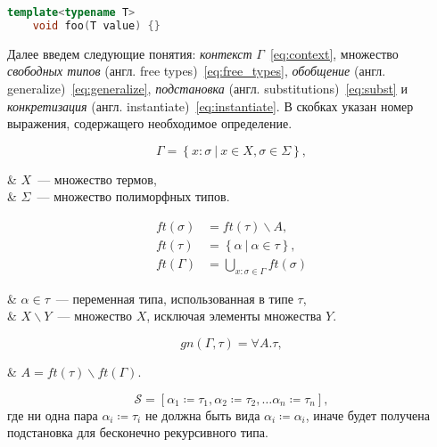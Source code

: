 \begin{lstlisting}[language=C++,label=lst:generics,caption={Определение обобщенной функции в C++}]
    template<typename T>
    void foo(T value) {}
\end{lstlisting}

Далее введем следующие понятия:
\textit{контекст} $\Gamma$~\eqref{eq:context},
множество \textit{свободных типов} (англ. free types)~\eqref{eq:free_types},
\textit{обобщение} (англ. generalize)~\eqref{eq:generalize},
\textit{подстановка} (англ. substitutions)~\eqref{eq:subst} и
\textit{конкретизация} (англ. instantiate)~\eqref{eq:instantiate}.
В скобках указан номер выражения, содержащего необходимое определение.

\begin{equation}
    \label{eq:context}
    \Gamma = \left\{ x: \sigma ~|~ x \in X, \sigma \in \Sigma \right\},
\end{equation}
\begin{eqrem}
    & $X$~--- множество термов,                 \\
    & $\Sigma$~--- множество полиморфных типов. \\
\end{eqrem}

\begin{equation}
    \label{eq:free_types}
    \begin{aligned}
        ft(\sigma) &= ft(\tau) \backslash A, \\
        ft(\tau)   &= \left\{ \alpha ~|~ \alpha \in \tau \right\}, \\
        ft(\Gamma) &= \bigcup_{x: \sigma \in \Gamma} ft(\sigma)
    \end{aligned}
\end{equation}
\begin{eqrem}
    & $\alpha \in \tau$~--- переменная типа, использованная в типе $\tau$, \\
    & $X \backslash Y$~--- множество $X$, исключая элементы множества $Y$. \\
\end{eqrem}

\begin{equation}
    \label{eq:generalize}
    gn(\Gamma, \tau) = \forall A. \tau,
\end{equation}
\begin{eqrem}
    & $A = ft(\tau) \backslash ft(\Gamma)$.\\
\end{eqrem}

\begin{equation}
    \label{eq:subst}
    \mathcal{S} = \left[ \alpha_1 \coloneqq \tau_1, \alpha_2 \coloneqq \tau_2, \ldots \alpha_n \coloneqq \tau_n \right],
\end{equation}
где ни одна пара $\alpha_i \coloneqq \tau_i$ не должна быть вида $\alpha_i \coloneqq \alpha_i$, иначе будет получена подстановка для бесконечно рекурсивного типа.

